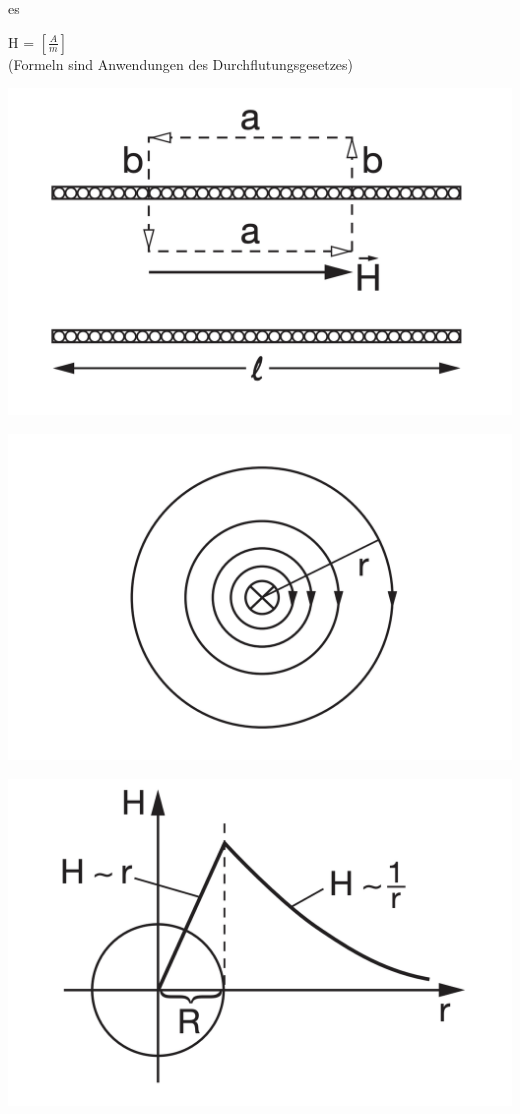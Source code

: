 es\documentclass[a4paper, fontsize=8pt, landscape]{scrartcl}
\begin{document}
\begin{multicols*}{4}
    H = $[\frac{A}{m}]$\\
    (Formeln sind Anwendungen des Durchflutungsgesetzes)
    
    
    \begin{center}
        \includegraphics[scale=0.1]{Images/Spulemagfeld.png}
    \end{center}
    \begin{center}
        \includegraphics[scale=0.1]{Images/geraderLeiter.png}
    \end{center}
    \begin{center}
        \includegraphics[scale=0.1]{Images/dickesKabel.png}
    \end{center}
    

\end{multicols*}
\end{document}
